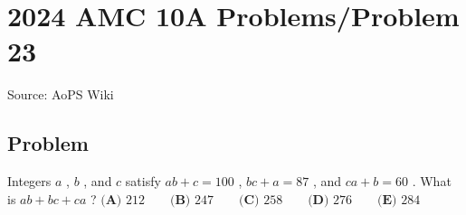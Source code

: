 \documentclass[12pt]{article}
\begin{document}
\section*{{2024 AMC 10A Problems/Problem 23}}
Source: AoPS Wiki

\subsection*{Problem}
Integers $a$ , $b$ , and $c$ satisfy $ab + c = 100$ , $bc + a = 87$ , and $ca + b = 60$ . What is $ab + bc + ca$ ? $\textbf{(A) }212 \qquad \textbf{(B) }247 \qquad \textbf{(C) }258 \qquad \textbf{(D) }276 \qquad \textbf{(E) }284 \qquad$
\end{document}
